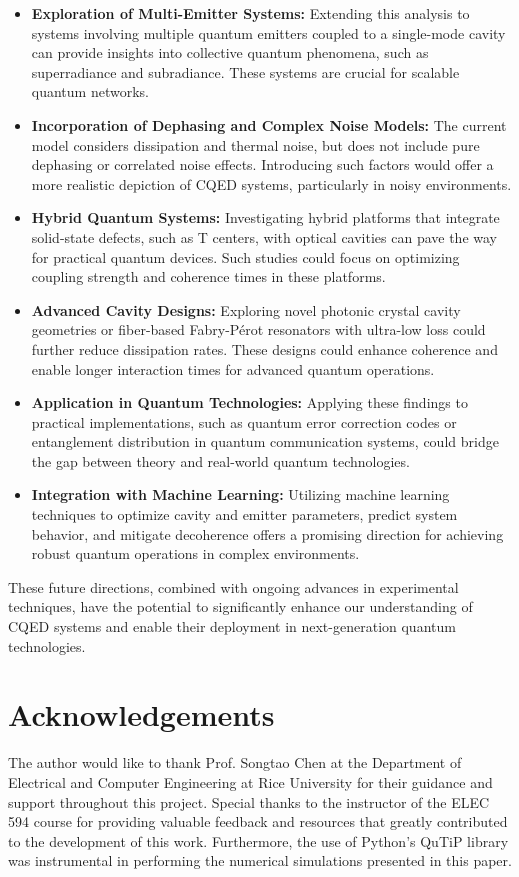 \documentclass[conference]{IEEEtran}
\begin{document}
\begin{itemize}
    \item \textbf{Exploration of Multi-Emitter Systems:} Extending this analysis to systems involving multiple quantum emitters coupled to a single-mode cavity can provide insights into collective quantum phenomena, such as superradiance and subradiance. These systems are crucial for scalable quantum networks.
    \item \textbf{Incorporation of Dephasing and Complex Noise Models:} The current model considers dissipation and thermal noise, but does not include pure dephasing or correlated noise effects. Introducing such factors would offer a more realistic depiction of CQED systems, particularly in noisy environments.
    \item \textbf{Hybrid Quantum Systems:} Investigating hybrid platforms that integrate solid-state defects, such as T centers, with optical cavities can pave the way for practical quantum devices. Such studies could focus on optimizing coupling strength and coherence times in these platforms.
    \item \textbf{Advanced Cavity Designs:} Exploring novel photonic crystal cavity geometries or fiber-based Fabry-Pérot resonators with ultra-low loss could further reduce dissipation rates. These designs could enhance coherence and enable longer interaction times for advanced quantum operations.
    \item \textbf{Application in Quantum Technologies:} Applying these findings to practical implementations, such as quantum error correction codes or entanglement distribution in quantum communication systems, could bridge the gap between theory and real-world quantum technologies.
    \item \textbf{Integration with Machine Learning:} Utilizing machine learning techniques to optimize cavity and emitter parameters, predict system behavior, and mitigate decoherence offers a promising direction for achieving robust quantum operations in complex environments.
\end{itemize}

These future directions, combined with ongoing advances in experimental techniques, have the potential to significantly enhance our understanding of CQED systems and enable their deployment in next-generation quantum technologies.

\section*{Acknowledgements}
The author would like to thank Prof. Songtao Chen at the Department of Electrical and Computer Engineering at Rice University for their guidance and support throughout this project. Special thanks to the instructor of the ELEC 594 course for providing valuable feedback and resources that greatly contributed to the development of this work. Furthermore, the use of Python’s QuTiP library was instrumental in performing the numerical simulations presented in this paper. 
\end{document}
